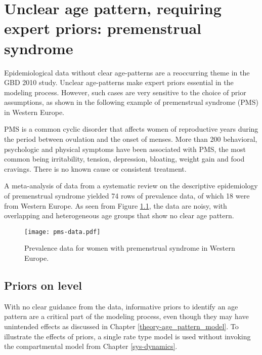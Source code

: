 \chapter{Unclear age pattern, requiring expert priors: premenstrual syndrome}
\label{applications-priors_knots_select}

Epidemiological data without clear age-patterns are a reoccurring theme in the GBD 2010 study.  Unclear age-patterns make expert priors essential in the modeling process.  However, such cases are very sensitive to the choice of prior assumptions, as shown in the following example of premenstrual syndrome (PMS) in Western Europe.

PMS is a common cyclic disorder that affects women of reproductive years during the period between ovulation and the onset of menses.  More than 200 behavioral, psychologic and physical symptoms have been associated with PMS, the most common being irritability, tension, depression, bloating, weight gain and food cravings.  There is no known cause or consistent treatment. \cite{dickerson_premenstrual_2003, singh_incidence_1998, goodale_alleviation_1990}

A meta-analysis of data from a systematic review on the descriptive epidemiology of premenstrual syndrome yielded 74 rows of prevalence data, of which 18 were from Western Europe.  As seen from Figure \ref{fig:app-pms_data}, the data are noisy, with overlapping and heterogeneous age groups that show no clear age pattern.

    \begin{figure}[h]
        \begin{center}
            \texttt{[image: pms-data.pdf]}
            \caption{Prevalence data for women with premenstrual syndrome in Western Europe.}
        \end{center}
        \label{fig:app-pms_data}
    \end{figure}

\section{Priors on level} \label{sec:app-priors on level}
With no clear guidance from the data, informative priors to identify an age pattern are a critical part of the modeling process, even though they may have unintended effects as discussed in Chapter \ref{theory-age_pattern_model}.  To illustrate the effects of priors, a single rate type model is used without invoking the compartmental model from Chapter \ref{sys-dynamics}.

